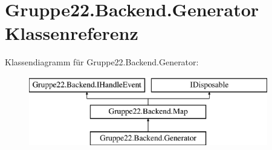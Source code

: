 \hypertarget{class_gruppe22_1_1_backend_1_1_generator}{\section{Gruppe22.\-Backend.\-Generator Klassenreferenz}
\label{class_gruppe22_1_1_backend_1_1_generator}
}
Klassendiagramm für Gruppe22.\-Backend.\-Generator\-:\begin{figure}[H]
\begin{center}
\leavevmode
\includegraphics[height=3.000000cm]{class_gruppe22_1_1_backend_1_1_generator}
\end{center}
\end{figure}
